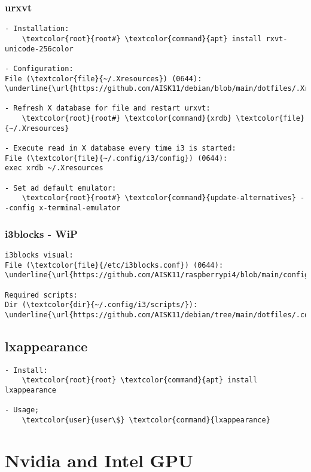 \documentclass[10pt, a4paper, onecolumn, openany]{book} %
\begin{document}
\subsection{urxvt}
\begin{Verbatim}[commandchars=\\\{\}]
- Installation:
    \textcolor{root}{root#} \textcolor{command}{apt} install rxvt-unicode-256color

- Configuration:
File (\textcolor{file}{~/.Xresources}) (0644):
\underline{\url{https://github.com/AISK11/debian/blob/main/dotfiles/.Xresources}}

- Refresh X database for file and restart urxvt:
    \textcolor{root}{root#} \textcolor{command}{xrdb} \textcolor{file}{~/.Xresources}
    
- Execute read in X database every time i3 is started:
File (\textcolor{file}{~/.config/i3/config}) (0644):
exec xrdb ~/.Xresources

- Set ad default emulator:
    \textcolor{root}{root#} \textcolor{command}{update-alternatives} --config x-terminal-emulator
\end{Verbatim}


\subsection{i3blocks - WiP}
\begin{Verbatim}[commandchars=\\\{\}]
i3blocks visual:
File (\textcolor{file}{/etc/i3blocks.conf}) (0644):
\underline{\url{https://github.com/AISK11/raspberrypi4/blob/main/config_files/i3blocks.conf}}

Required scripts:
Dir (\textcolor{dir}{~/.config/i3/scripts/}):
\underline{\url{https://github.com/AISK11/debian/tree/main/dotfiles/.config/i3/scripts}}
\end{Verbatim}

\section{lxappearance}
\begin{Verbatim}[commandchars=\\\{\}]
- Install:
    \textcolor{root}{root} \textcolor{command}{apt} install lxappearance
    
- Usage;
    \textcolor{user}{user\$} \textcolor{command}{lxappearance}
\end{Verbatim}


\chapter{Nvidia and Intel GPU}
\end{document}
